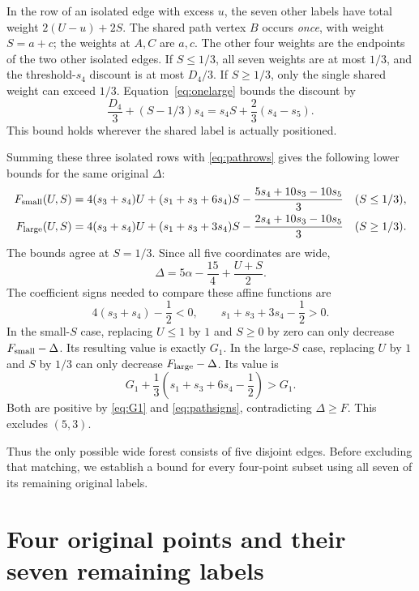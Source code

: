 \documentclass[11pt]{article}
\theoremstyle{definition}
\theoremstyle{remark}
\begin{document}
In the row of an isolated edge with excess $u$, the seven other labels
have total weight $2(U-u)+2S$. The shared path vertex $B$ occurs
\emph{once}, with weight $S=a+c$; the weights at $A,C$ are $a,c$.
The other four weights are the endpoints of the two other isolated
edges. If $S\leq1/3$, all seven weights are at most $1/3$, and the
threshold-$s_4$ discount is at most $D_4/3$.
If $S\geq1/3$, only the single shared weight can exceed $1/3$.
Equation~\eqref{eq:onelarge} bounds the discount by
\[
 \frac{D_4}{3}+(S-1/3)s_4
    =s_4S+\frac23(s_4-s_5).
\]
This bound holds wherever the shared label is actually positioned.

Summing these three isolated rows with \eqref{eq:pathrows} gives the
following lower bounds for the same original $\Delta$:
\begin{align}\label{eq:pathsmall}
 F_{\rm small}(U,S)
 &=4(s_3+s_4)U+(s_1+s_3+6s_4)S
       -\frac{5s_4+10s_3-10s_5}{3}
       &&(S\leq1/3),\\
 F_{\rm large}(U,S)
 &=4(s_3+s_4)U+(s_1+s_3+3s_4)S
       -\frac{2s_4+10s_3-10s_5}{3}
       &&(S\geq1/3).\label{eq:pathlarge}
\end{align}
The bounds agree at $S=1/3$. Since all five coordinates are wide,
\begin{equation}\label{eq:pathexact}
 \Delta=5\alpha-\frac{15}{4}+\frac{U+S}{2}.
\end{equation}
The coefficient signs needed to compare these affine functions are
\begin{equation}\label{eq:pathsigns}
 4(s_3+s_4)-\frac12<0,
 \qquad s_1+s_3+3s_4-\frac12>0.
\end{equation}
In the small-$S$ case, replacing $U\leq1$ by $1$ and $S\geq0$ by
zero can only decrease $F_{\rm small}-\Delta$. Its resulting value is
exactly $G_1$. In the large-$S$ case, replacing $U$ by $1$ and $S$ by
$1/3$ can only decrease $F_{\rm large}-\Delta$. Its value is
\[
 G_1+\frac13\left(s_1+s_3+6s_4-\frac12\right)>G_1.
\]
Both are positive by \eqref{eq:G1} and \eqref{eq:pathsigns},
contradicting $\Delta\geq F$. This excludes $(5,3)$.

Thus the only possible wide forest consists of five disjoint edges.
Before excluding that matching, we establish a bound for every four-point
subset using all seven of its remaining original labels.

\section{Four original points and their seven remaining labels}\label{sec:quartet}
\end{document}
